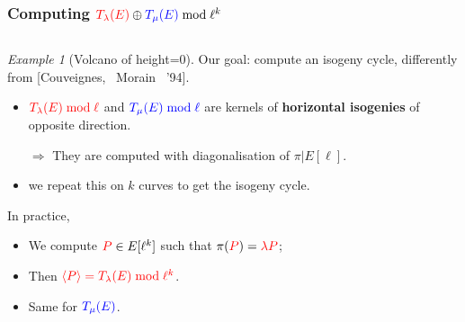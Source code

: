 \documentclass[10pt,a4paper]{beamer}
\theoremstyle{plain}
\theoremstyle{definition}
\theoremstyle{definition}
\theoremstyle{definition}
\theoremstyle{definition}
\theoremstyle{remark}
\theoremstyle{remark}
\newtheorem{exe}[thm]{Example}
\def\red#1{\textcolor{red}{#1}}
\def\blu#1{\textcolor{blue}{#1}}
\begin{document}
\begin{frame}
\frametitle{Computing $\red{T_{\lambda}(E)} \oplus \blu{T_{\mu}(E)} \bmod \ell^k $}
\begin{columns}
\begin{column}{6.5cm}

\begin{exe}[Volcano of height=0]


Our goal: compute an isogeny cycle, differently from [Couveignes,~ Morain~ '94].

\vspace{-0.5mm}
\begin{itemize}
\item $\red{T_\lambda(E)\bmod\ell}$ and $\blu{T_\mu(E)\bmod\ell}$ are
    kernels of \textbf{horizontal isogenies} of opposite direction.
  
$\Rightarrow$ They are computed with diagonalisation of $\pi | E[\ell]$.

\item we repeat this on $k$ curves to get the isogeny cycle.

\end{itemize}

In practice, 
\begin{itemize}
\item We compute $\red{P}\in E[\ell^k]$ such that $\pi(\color{red} {P} \color{black})= \color{red} \lambda {P}$;
\item Then $\red{\langle P\rangle = T_\lambda(E)  \bmod \ell^k}$.
\item Same for $\blu{T_\mu(E)}$.
\end{itemize}

\end{exe}


\end{column}
\end{columns}
\end{frame}
\end{document}
